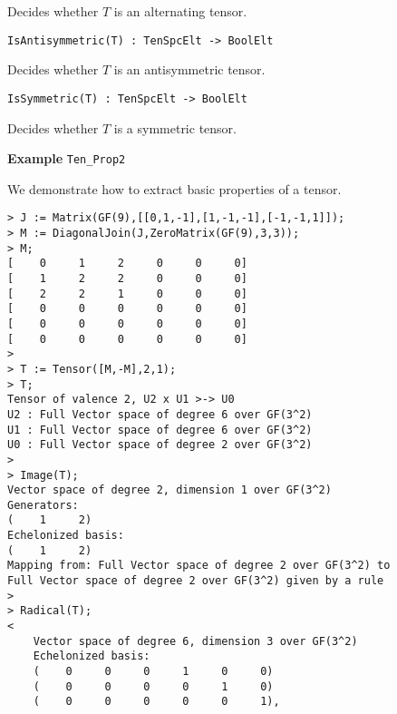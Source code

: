 Decides whether $T$ is an alternating tensor.

\color{blue}
{\small \begin{verbatim}
IsAntisymmetric(T) : TenSpcElt -> BoolElt
\end{verbatim} }
\color{black}

Decides whether $T$ is an antisymmetric tensor.

\color{blue}
{\small \begin{verbatim}
IsSymmetric(T) : TenSpcElt -> BoolElt
\end{verbatim} }
\color{black}

Decides whether $T$ is a symmetric tensor.

\begin{framed} {\bf Example} {\tt Ten\_Prop2}\\
{\small We demonstrate how to extract basic properties of a tensor.
\begin{lstlisting}[frame=single,basicstyle=\ttfamily\color{black!30!
teal},backgroundcolor=\color{white!70!gray}]
> J := Matrix(GF(9),[[0,1,-1],[1,-1,-1],[-1,-1,1]]);
> M := DiagonalJoin(J,ZeroMatrix(GF(9),3,3));
> M;
[    0     1     2     0     0     0]
[    1     2     2     0     0     0]
[    2     2     1     0     0     0]
[    0     0     0     0     0     0]
[    0     0     0     0     0     0]
[    0     0     0     0     0     0]
> 
> T := Tensor([M,-M],2,1);
> T;
Tensor of valence 2, U2 x U1 >-> U0
U2 : Full Vector space of degree 6 over GF(3^2)
U1 : Full Vector space of degree 6 over GF(3^2)
U0 : Full Vector space of degree 2 over GF(3^2)
> 
> Image(T);
Vector space of degree 2, dimension 1 over GF(3^2)
Generators:
(    1     2)
Echelonized basis:
(    1     2)
Mapping from: Full Vector space of degree 2 over GF(3^2) to 
Full Vector space of degree 2 over GF(3^2) given by a rule
> 
> Radical(T);
<
    Vector space of degree 6, dimension 3 over GF(3^2)
    Echelonized basis:
    (    0     0     0     1     0     0)
    (    0     0     0     0     1     0)
    (    0     0     0     0     0     1),


\end{lstlisting}}
\end{framed}
